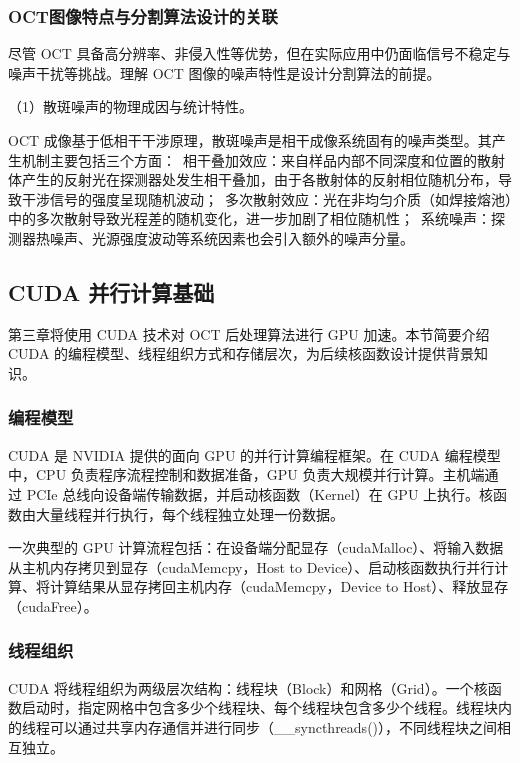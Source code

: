 \subsubsection{OCT图像特点与分割算法设计的关联}

尽管 OCT 具备高分辨率、非侵入性等优势，但在实际应用中仍面临信号不稳定与噪声干扰等挑战。理解 OCT 图像的噪声特性是设计分割算法的前提。

（1）散斑噪声的物理成因与统计特性。

OCT 成像基于低相干干涉原理，散斑噪声是相干成像系统固有的噪声类型。其产生机制主要包括三个方面：~相干叠加效应：来自样品内部不同深度和位置的散射体产生的反射光在探测器处发生相干叠加，由于各散射体的反射相位随机分布，导致干涉信号的强度呈现随机波动；~多次散射效应：光在非均匀介质（如焊接熔池）中的多次散射导致光程差的随机变化，进一步加剧了相位随机性；~系统噪声：探测器热噪声、光源强度波动等系统因素也会引入额外的噪声分量。

\subsection{CUDA 并行计算基础}

第三章将使用 CUDA 技术对 OCT 后处理算法进行 GPU 加速。本节简要介绍 CUDA 的编程模型、线程组织方式和存储层次，为后续核函数设计提供背景知识。

\subsubsection{编程模型}

CUDA 是 NVIDIA 提供的面向 GPU 的并行计算编程框架。在 CUDA 编程模型中，CPU 负责程序流程控制和数据准备，GPU 负责大规模并行计算。主机端通过 PCIe 总线向设备端传输数据，并启动核函数（Kernel）在 GPU 上执行。核函数由大量线程并行执行，每个线程独立处理一份数据。

一次典型的 GPU 计算流程包括：在设备端分配显存（cudaMalloc）、将输入数据从主机内存拷贝到显存（cudaMemcpy，Host to Device）、启动核函数执行并行计算、将计算结果从显存拷回主机内存（cudaMemcpy，Device to Host）、释放显存（cudaFree）。

\subsubsection{线程组织}

CUDA 将线程组织为两级层次结构：线程块（Block）和网格（Grid）。一个核函数启动时，指定网格中包含多少个线程块、每个线程块包含多少个线程。线程块内的线程可以通过共享内存通信并进行同步（\_\_syncthreads()），不同线程块之间相互独立。

